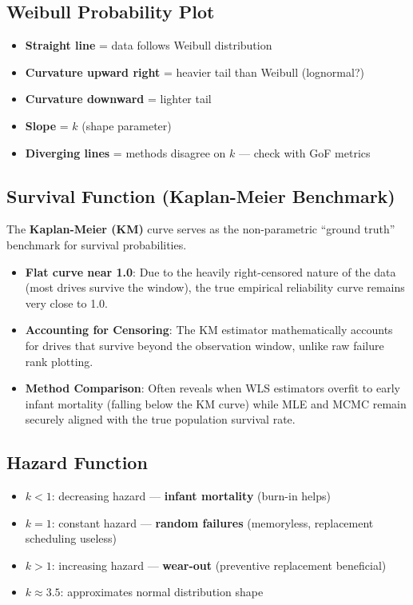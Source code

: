 \documentclass[
]{article}
\providecommand{\tightlist}{%
  \setlength{\itemsep}{0pt}\setlength{\parskip}{0pt}}
\begin{document}
\subsection{Weibull Probability Plot}\label{weibull-probability-plot}

\begin{itemize}
\tightlist
\item
  \textbf{Straight line} = data follows Weibull distribution
\item
  \textbf{Curvature upward right} = heavier tail than Weibull
  (lognormal?)
\item
  \textbf{Curvature downward} = lighter tail
\item
  \textbf{Slope} = \(k\) (shape parameter)
\item
  \textbf{Diverging lines} = methods disagree on \(k\) --- check with
  GoF metrics
\end{itemize}

\subsection{Survival Function (Kaplan-Meier Benchmark)}\label{survival-function-kaplan-meier-benchmark}

The \textbf{Kaplan-Meier (KM)} curve serves as the non-parametric ``ground truth'' benchmark for survival probabilities.
\begin{itemize}
\tightlist
\item
  \textbf{Flat curve near 1.0}: Due to the heavily right-censored nature of the data (most drives survive the window), the true empirical reliability curve remains very close to 1.0. 
\item
  \textbf{Accounting for Censoring}: The KM estimator mathematically accounts for drives that survive beyond the observation window, unlike raw failure rank plotting.
\item
  \textbf{Method Comparison}: Often reveals when WLS estimators overfit to early infant mortality (falling below the KM curve) while MLE and MCMC remain securely aligned with the true population survival rate.
\end{itemize}

\subsection{Hazard Function}\label{hazard-function}

\begin{itemize}
\tightlist
\item
  \(k < 1\): decreasing hazard --- \textbf{infant mortality} (burn-in
  helps)
\item
  \(k = 1\): constant hazard --- \textbf{random failures} (memoryless,
  replacement scheduling useless)
\item
  \(k > 1\): increasing hazard --- \textbf{wear-out} (preventive
  replacement beneficial)
\item
  \(k \approx 3.5\): approximates normal distribution shape
\end{itemize}
\end{document}
